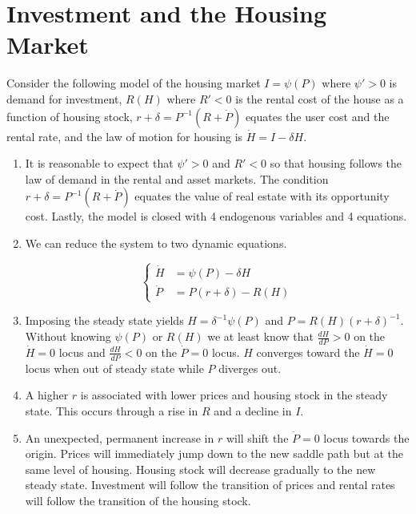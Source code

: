 \documentclass[11pt]{article}
\begin{document}
\section{Investment and the Housing Market}

    Consider the following model of the housing market $I = \psi(P)$ where $\psi' > 0$ is demand for investment, $R(H)$ where $R' < 0$ is the rental cost of the house as a function of housing stock, $r + \delta = P^{-1}(R + \dot P)$ equates the user cost and the rental rate, and the law of motion for housing is $\dot H = I - \delta H$.

    \begin{enumerate}

        \item It is reasonable to expect that $\psi' > 0$ and $R' < 0$ so that housing follows the law of demand in the rental and asset markets. The condition $r + \delta = P^{-1}(R + \dot P)$ equates the value of real estate with its opportunity cost. Lastly, the model is closed with 4 endogenous variables and 4 equations.

        \item We can reduce the system to two dynamic equations.

            $$ \begin{cases}
            \dot H & = \psi(P) - \delta H \\
            \dot P & = P(r + \delta) - R(H)
            \end{cases} $$

        \item Imposing the steady state yields $H = \delta^{-1} \psi(P)$ and $P = R(H) (r + \delta)^{-1}$. Without knowing $\psi(P)$ or $R(H)$ we at least know that $\frac{dH}{dP} > 0$ on the $\dot H = 0$ locus and $\frac{dH}{dP} < 0$ on the $\dot P = 0$ locus. $H$ converges toward the $\dot H = 0$ locus when out of steady state while $P$ diverges out.

        \item A higher $r$ is associated with lower prices and housing stock in the steady state. This occurs through a rise in $R$ and a decline in $I$.

        \item An unexpected, permanent increase in $r$ will shift the $\dot P = 0$ locus towards the origin. Prices will immediately jump down to the new saddle path but at the same level of housing. Housing stock will decrease gradually to the new steady state. Investment will follow the transition of prices and rental rates will follow the transition of the housing stock.


\end{enumerate}
\end{document}

